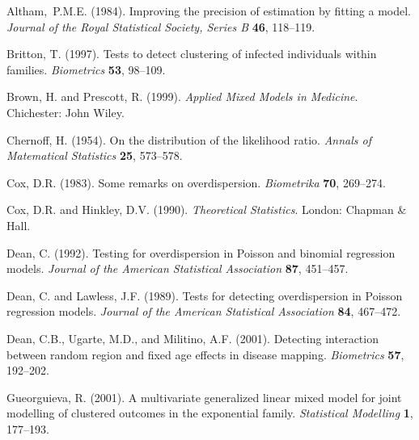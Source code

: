 \documentclass[useAMS,usenatbib,referee]{biom}
\begin{document}
\begin{thebibliography}{}


Altham,~P.M.E. (1984).
 Improving the precision of estimation by fitting a model.
{\em Journal of the Royal Statistical Society, Series B} {\bf 46}, 118--119.


Britton, T. (1997).
Tests to detect clustering of infected individuals within families.
{\em Biometrics} {\bfseries 53}, 98--109.

Brown, H. and Prescott, R. (1999).
{\em Applied Mixed Models in Medicine}.
Chichester: John Wiley.

Chernoff, H. (1954).
On the distribution of the likelihood ratio. 
{\em Annals of Matematical Statistics} {\bfseries 25}, 573--578.

Cox, D.R. (1983).
Some remarks on overdispersion.
{\em Biometrika} {\bfseries 70}, 269--274.

Cox, D.R. and Hinkley, D.V. (1990).
{\em Theoretical Statistics}. 
London: Chapman \& Hall.

Dean, C. (1992).
Testing for overdispersion in Poisson and binomial regression models.
{\em Journal of the American Statistical Association} {\bfseries 87}, 451--457.

Dean, C. and Lawless, J.F. (1989).
Tests for detecting overdispersion in Poisson regression models.
{\em Journal of the American Statistical Association} {\bfseries 84}, 467--472.


Dean, C.B., Ugarte, M.D., and Militino, A.F. (2001). 
Detecting interaction between random region and fixed age effects in disease mapping.
{\em Biometrics} {\bfseries 57}, 192--202.

Gueorguieva, R. (2001).
A multivariate generalized linear mixed model for joint modelling of clustered outcomes in the exponential family.
{\em Statistical Modelling} {\bfseries 1}, 177--193.


\end{thebibliography}
\end{document}
